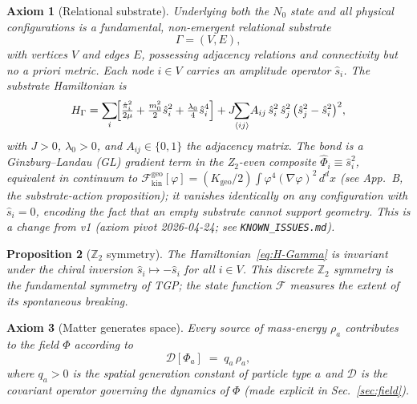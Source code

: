 \documentclass[11pt,a4paper]{article}
\renewcommand{\Phi}{\varPhi}
\newcommand{\Nzero}{N_{0}}
\newcommand{\Ffield}{\mathcal{F}}
\newcommand{\Zp}{\mathbb{Z}_{2}}
\newcommand{\DD}{\mathcal{D}}
\newtheorem{axiom}{Axiom}
\newtheorem{proposition}[axiom]{Proposition}
\begin{document}
\begin{axiom}[Relational substrate]\label{ax:substrate}
Underlying both the $\Nzero$ state and all physical configurations is a
fundamental, non-emergent relational substrate
\begin{equation}\label{eq:Gamma}
  \Gamma=(V,E),
\end{equation}
with vertices $V$ and edges $E$, possessing adjacency relations and
connectivity but \emph{no a priori metric}. Each node $i\in V$ carries an
amplitude operator $\hat{s}_{i}$. The substrate Hamiltonian is
\begin{equation}\label{eq:H-Gamma}
  H_{\Gamma}=\sum_{i}\!\Bigl[
    \tfrac{\hat{\pi}_{i}^{2}}{2\mu}
    +\tfrac{m_{0}^{2}}{2}\hat{s}_{i}^{2}
    +\tfrac{\lambda_{0}}{4}\hat{s}_{i}^{4}
  \Bigr]
  + J\!\!\sum_{\langle ij\rangle}\! A_{ij}\,
    \hat{s}_{i}^{2}\,\hat{s}_{j}^{2}\,
    \bigl(\hat{s}_{j}^{2}-\hat{s}_{i}^{2}\bigr)^{2},
\end{equation}
with $J>0$, $\lambda_{0}>0$, and $A_{ij}\in\{0,1\}$ the adjacency matrix.
The bond is a Ginzburg--Landau (GL) gradient term in the Z$_{2}$-even
composite $\hat{\Phi}_{i}\equiv\hat{s}_{i}^{2}$, equivalent in continuum
to $\mathcal{F}_{\mathrm{kin}}^{\mathrm{geo}}[\varphi]=
(K_{\mathrm{geo}}/2)\int\varphi^{4}(\nabla\varphi)^{2}\,d^{d}x$ (see
App.~B, the substrate-action proposition); it vanishes identically on
any configuration with $\hat{s}_{i}=0$, encoding the fact that
\emph{an empty substrate cannot support geometry}. This is a change
from v1 (axiom pivot 2026-04-24; see \texttt{KNOWN\_ISSUES.md}).
\end{axiom}

\begin{proposition}[$\Zp$ symmetry]\label{prop:Z2}
The Hamiltonian~\eqref{eq:H-Gamma} is invariant under the chiral inversion
$\hat{s}_{i}\mapsto-\hat{s}_{i}$ for all $i\in V$. This discrete $\Zp$
symmetry is the fundamental symmetry of TGP; the state function $\Ffield$
measures the extent of its spontaneous breaking.
\end{proposition}

\begin{axiom}[Matter generates space]\label{ax:source}
Every source of mass-energy $\rho_{a}$ contributes to the field $\Phi$
according to
\begin{equation}\label{eq:source}
  \DD[\Phi_{a}]\;=\;q_{a}\,\rho_{a},
\end{equation}
where $q_{a}>0$ is the \emph{spatial generation constant} of particle
type $a$ and $\DD$ is the covariant operator governing the dynamics of
$\Phi$ (made explicit in Sec.~\ref{sec:field}).
\end{axiom}
\end{document}
